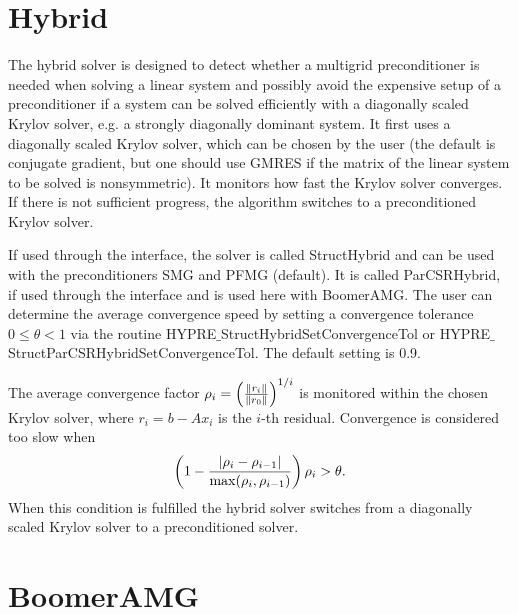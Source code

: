 

\section{Hybrid}

The hybrid solver is designed to detect whether a multigrid preconditioner
is needed when solving a linear system and possibly avoid the expensive setup
of a preconditioner if a system can be solved efficiently with a diagonally
scaled Krylov solver, e.g. a strongly diagonally dominant system. 
It first uses a diagonally scaled Krylov solver, which can be chosen by the user
(the default is conjugate gradient, but one should use GMRES if the matrix of the 
linear system to be solved is nonsymmetric). It monitors how fast the Krylov solver
converges.
If there is not sufficient progress, the algorithm switches to a preconditioned
Krylov solver.

If used through the  interface, the solver is called StructHybrid
and can be used with the preconditioners SMG and PFMG (default).
It is called ParCSRHybrid, if used through the  interface and is used here
with BoomerAMG.
The user can determine the average convergence speed by setting a convergence tolerance $0 \leq \theta
< 1$
via the routine HYPRE$\_$StructHybridSetConvergenceTol or HYPRE$\_$StructParCSRHybridSetConvergenceTol.
The default setting is 0.9.

The average convergence factor $\rho_i = \left({{\| r_i \|} \over {\| r_0 \|}}\right)^{1/i}$ is
monitored within the chosen Krylov solver, where $r_i = b - Ax_{i}$ is the $i$-th residual.
Convergence is considered too slow when
\begin{equation}
\left( 1 - {{|\rho_i - \rho_{i-1}|} \over { \max(\rho_i, \rho_{i-1})}} \right) \rho_i > \theta .
\end{equation}
When this condition is fulfilled the hybrid solver switches from a diagonally scaled 
Krylov solver to a preconditioned solver.


\section{BoomerAMG}

